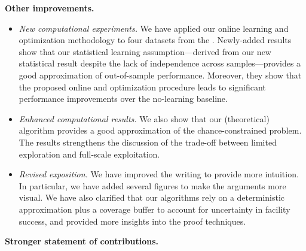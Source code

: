 \documentclass[11pt]{article}
\begin{document}
\textbf{Other improvements.}

\begin{itemize}[topsep=-2pt,itemsep=-2pt]
\item[--] \emph{New computational experiments.} We have applied our online learning and optimization methodology to four datasets from the \cite{UCI}. Newly-added results show that our statistical learning assumption---derived from our new statistical result despite the lack of independence across samples---provides a good approximation of out-of-sample performance. Moreover, they show that the proposed online and optimization procedure leads to significant performance improvements over the no-learning baseline.
\item[--] \emph{Enhanced computational results.} We also show that our (theoretical) algorithm provides a good approximation of the chance-constrained problem. The results strengthens the discussion of the trade-off between limited exploration and full-scale exploitation.
\item[--] \emph{Revised exposition.} We have improved the writing to provide more intuition. In particular, we have added several figures to make the arguments more visual. We have also clarified that our algorithms rely on a deterministic approximation plus a coverage buffer to account for uncertainty in facility success, and provided more insights into the proof techniques.
\end{itemize}

\textbf{Stronger statement of contributions.}\
\end{document}
